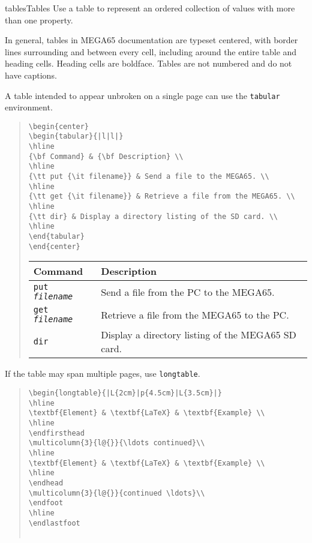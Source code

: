 \begin{sgentry}{tables}{Tables}
    Use a table to represent an ordered collection of values with more than one property.

    In general, tables in MEGA65 documentation are typeset centered, with border lines surrounding and between every cell, including around the entire table and heading cells. Heading cells are boldface. Tables are not numbered and do not have captions.

    A table intended to appear unbroken on a single page can use the \texttt{tabular} environment.

    \begin{quote}
\begin{verbatim}
\begin{center}
\begin{tabular}{|l|l|}
\hline
{\bf Command} & {\bf Description} \\
\hline
{\tt put {\it filename}} & Send a file to the MEGA65. \\
\hline
{\tt get {\it filename}} & Retrieve a file from the MEGA65. \\
\hline
{\tt dir} & Display a directory listing of the SD card. \\
\hline
\end{tabular}
\end{center}
\end{verbatim}

\hrulefill

        \begin{center}
        \begin{tabular}{|l|l|}
        \hline
        {\bf Command} & {\bf Description} \\
        \hline
        {\tt put {\it filename}} & Send a file from the PC to the MEGA65. \\
        \hline
        {\tt get {\it filename}} & Retrieve a file from the MEGA65 to the PC. \\
        \hline
        {\tt dir} & Display a directory listing of the MEGA65 SD card. \\
        \hline
        \end{tabular}
        \end{center}
    \end{quote}

    If the table may span multiple pages, use \texttt{longtable}.

\begin{quote}
\begin{verbatim}
\begin{longtable}{|L{2cm}|p{4.5cm}|L{3.5cm}|}
\hline
\textbf{Element} & \textbf{LaTeX} & \textbf{Example} \\
\hline
\endfirsthead
\multicolumn{3}{l@{}}{\ldots continued}\\
\hline
\textbf{Element} & \textbf{LaTeX} & \textbf{Example} \\
\hline
\endhead
\multicolumn{3}{l@{}}{continued \ldots}\\
\endfoot
\hline
\endlastfoot


\end{verbatim}
\end{quote}
\end{sgentry}
